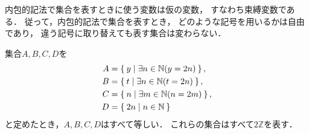  内包的記法で集合を表すときに使う変数は仮の変数，
 すなわち束縛変数である．
 従って，内包的記法で集合を表すとき，
 どのような記号を用いるかは自由であり，
 違う記号に取り替えても表す集合は変わらない．
 \begin{ex} \label{ex:naihousokubaku}
   集合$A,B, C,D$を
   \begin{align*}
     A & = \Set{ y \mid \exists n \in \mathbb{N} (y=2n) }, \\
     B & = \Set{ t \mid \exists n \in \mathbb{N} (t=2n) }, \\
     C & = \Set{ n \mid \exists m \in \mathbb{N} (n = 2m) } , \\
     D & = \Set{ 2n \mid n \in \mathbb{N} }
   \end{align*}
   と定めたとき，$A,B,C,D$はすべて等しい．
   これらの集合はすべて$2 \mathbb{Z}$を表す．
 \end{ex}
